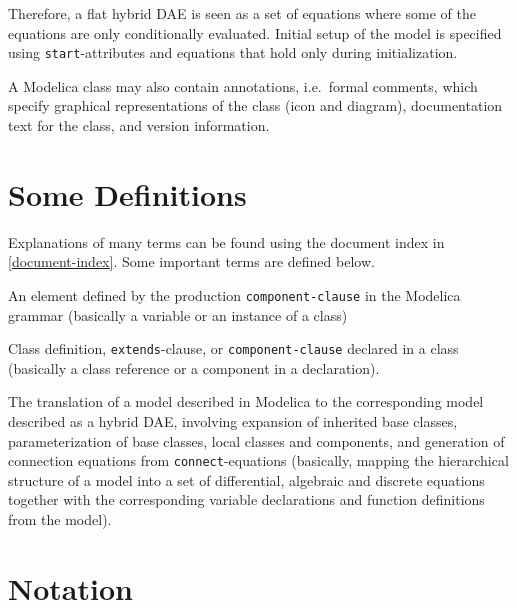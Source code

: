 Therefore, a flat hybrid DAE is seen as a set of equations where some of the equations are only conditionally evaluated.
Initial setup of the model is specified using \lstinline!start!-attributes and equations that hold only during initialization.

A Modelica class may also contain annotations, i.e.\ formal comments,
which specify graphical representations of the class (icon and diagram),
documentation text for the class, and version information.

\section{Some Definitions}\label{some-definitions}

Explanations of many terms can be found using the document index in \cref{document-index}.
Some important terms are defined below.

\begin{definition}[Component]
An element defined by the production \lstinline[language=grammar]!component-clause! in the Modelica grammar (basically a variable or an instance of a class)
\end{definition}

\begin{definition}[Element]
Class definition, \lstinline!extends!-clause, or \lstinline[language=grammar]!component-clause! declared in a class (basically a class reference or a component in a declaration).
\end{definition}

\begin{definition}[Flattening]
The translation of a model described in Modelica to the corresponding model described as a hybrid DAE, involving expansion of inherited base classes, parameterization of base classes, local classes
and components, and generation of connection equations from \lstinline!connect!-equations (basically, mapping the hierarchical structure of a model into a set of differential, algebraic and discrete equations together with the corresponding variable declarations and function definitions from the model).
\end{definition}


\section{Notation}\label{notation}

